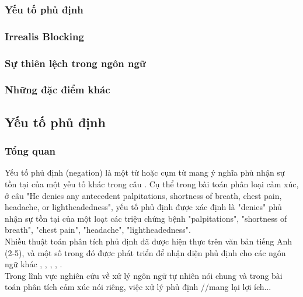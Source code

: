 \subsubsection*{Yếu tố phủ định}

\subsubsection*{Irrealis Blocking}
\subsubsection*{Sự thiên lệch trong ngôn ngữ}
\subsubsection*{Những đặc điểm khác}

\subsection{Yếu tố phủ định}
\subsubsection*{Tổng quan}
Yếu tố phủ định (negation) là một từ hoặc cụm từ mang ý nghĩa phủ nhận sự tồn tại của một yếu tố khác trong câu \cite{skeppstedt2016marker}. Cụ thể trong bài toán phân loại cảm xúc, ở câu "He denies any antecedent palpitations, shortness of breath, chest pain, headache, or lightheadedness", yếu tố phủ định được xác định là "denies" phủ nhận sự tồn tại của một loạt các triệu chứng bệnh "palpitations", "shortness of breath", "chest pain", "headache", "lightheadedness".  \\

Nhiều thuật toán phân tích phủ định đã được hiện thực trên văn bản tiếng Anh (2-5)\cite{Chapman2013}, \cite{Zeng2007} và một số trong đó được phát triển để nhận diện phủ định cho các ngôn ngữ khác \cite{costumero2014an}, \cite{benamara2012how}, \cite{gindl2006negation}, \cite{Chapman2013}, \cite{CruzDiaz2015}. \\


Trong lĩnh vực nghiên cứu về xử lý ngôn ngữ tự nhiên nói chung và trong bài toán phân tích cảm xúc nói riêng, việc xử lý phủ định //mang lại lợi ích... \\
\cite{liu2012sentiment}\cite{marsland2015machine}\cite{Giachanou2016}\cite{ali2013can}\cite{taboada2011lexicon}\cite{niu2006using}\cite{ohana2009sentiment}

